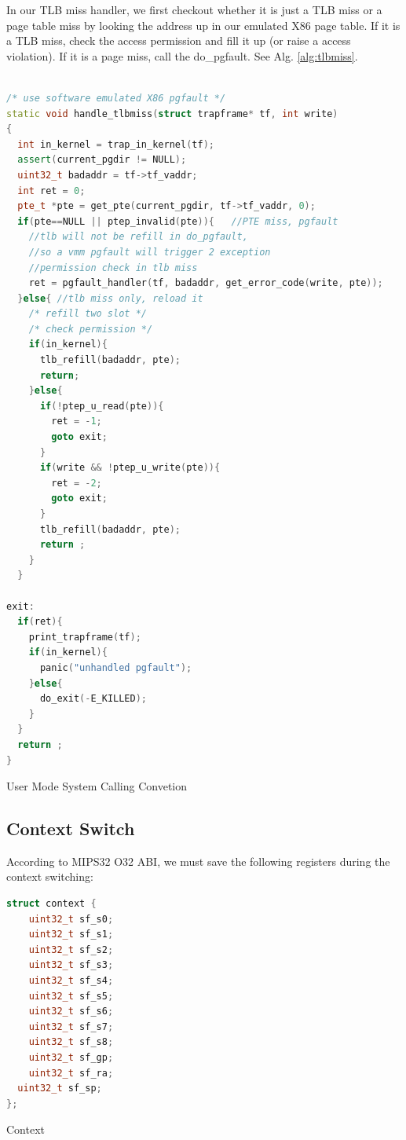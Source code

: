 \documentclass[a4paper]{article}
\begin{document}
In our TLB miss handler, we first checkout whether it is just a TLB miss
or a page table miss by looking the address up in our emulated X86 page table.
If it is a TLB miss, check the access permission and fill it up (or raise a
access violation). If it is a page miss, call the do\_pgfault. See Alg. \ref{alg:tlbmiss}.


\begin{algorithm}[h]

 \begin{lstlisting}[language={C++}]

/* use software emulated X86 pgfault */
static void handle_tlbmiss(struct trapframe* tf, int write)
{
  int in_kernel = trap_in_kernel(tf);
  assert(current_pgdir != NULL);
  uint32_t badaddr = tf->tf_vaddr;
  int ret = 0;
  pte_t *pte = get_pte(current_pgdir, tf->tf_vaddr, 0);
  if(pte==NULL || ptep_invalid(pte)){   //PTE miss, pgfault
    //tlb will not be refill in do_pgfault,
    //so a vmm pgfault will trigger 2 exception
    //permission check in tlb miss
    ret = pgfault_handler(tf, badaddr, get_error_code(write, pte));
  }else{ //tlb miss only, reload it
    /* refill two slot */
    /* check permission */
    if(in_kernel){
      tlb_refill(badaddr, pte); 
      return;
    }else{
      if(!ptep_u_read(pte)){
        ret = -1;
        goto exit;
      }
      if(write && !ptep_u_write(pte)){
        ret = -2;
        goto exit;
      }
      tlb_refill(badaddr, pte);
      return ;
    }
  }

exit:
  if(ret){
    print_trapframe(tf);
    if(in_kernel){
      panic("unhandled pgfault");
    }else{
      do_exit(-E_KILLED);
    }
  }
  return ;
}

\end{lstlisting}
\caption{User Mode System Calling Convetion}
\label{alg:tlbmiss}
\end{algorithm}

\subsection{Context Switch}
According to MIPS32 O32 ABI, we must save the following registers
during the context switching:

\begin{algorithm}[H]
 \begin{lstlisting}[language={C++}]
struct context {
	uint32_t sf_s0;
	uint32_t sf_s1;
	uint32_t sf_s2;
	uint32_t sf_s3;
	uint32_t sf_s4;
	uint32_t sf_s5;
	uint32_t sf_s6;
	uint32_t sf_s7;
	uint32_t sf_s8;
	uint32_t sf_gp;
	uint32_t sf_ra;
  uint32_t sf_sp;
};

\end{lstlisting}
\caption{Context}
\label{alg:context}
\end{algorithm}
\end{document}
